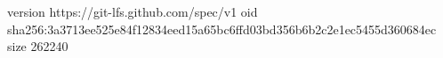 version https://git-lfs.github.com/spec/v1
oid sha256:3a3713ee525e84f12834eed15a65bc6ffd03bd356b6b2c2e1ec5455d360684ec
size 262240

